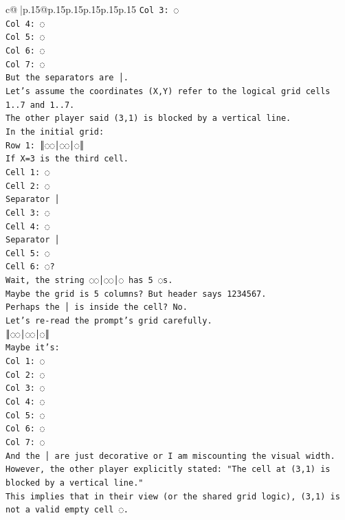 \documentclass{article}
\begin{document}
{\begin{supertabular}{c@{$\;$}|p{.15\linewidth}@{}p{.15\linewidth}p{.15\linewidth}p{.15\linewidth}p{.15\linewidth}p{.15\linewidth}}
{{{\texttt{Col 3: ◌} \\
\texttt{Col 4: ◌} \\
\texttt{Col 5: ◌} \\
\texttt{Col 6: ◌} \\
\texttt{Col 7: ◌} \\
\texttt{But the separators are │.} \\
\texttt{Let's assume the coordinates (X,Y) refer to the logical grid cells 1..7 and 1..7.} \\
\texttt{The other player said (3,1) is blocked by a vertical line.} \\
\texttt{In the initial grid:} \\
\texttt{Row 1: ║◌◌│◌◌│◌║} \\
\texttt{If X=3 is the third cell.} \\
\texttt{Cell 1: ◌} \\
\texttt{Cell 2: ◌} \\
\texttt{Separator │} \\
\texttt{Cell 3: ◌} \\
\texttt{Cell 4: ◌} \\
\texttt{Separator │} \\
\texttt{Cell 5: ◌} \\
\texttt{Cell 6: ◌?} \\
\texttt{Wait, the string ◌◌│◌◌│◌ has 5 ◌s.} \\
\texttt{Maybe the grid is 5 columns? But header says 1234567.} \\
\texttt{Perhaps the │ is inside the cell? No.} \\
\texttt{Let's re{-}read the prompt's grid carefully.} \\
\texttt{║◌◌│◌◌│◌║} \\
\texttt{Maybe it's:} \\
\texttt{Col 1: ◌} \\
\texttt{Col 2: ◌} \\
\texttt{Col 3: ◌} \\
\texttt{Col 4: ◌} \\
\texttt{Col 5: ◌} \\
\texttt{Col 6: ◌} \\
\texttt{Col 7: ◌} \\
\texttt{And the │ are just decorative or I am miscounting the visual width.} \\
\texttt{However, the other player explicitly stated: "The cell at (3,1) is blocked by a vertical line."} \\
\texttt{This implies that in their view (or the shared grid logic), (3,1) is not a valid empty cell ◌.} \\
}}}
\end{supertabular}}
\end{document}
